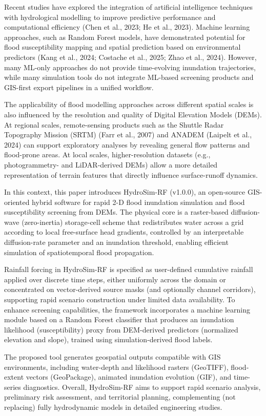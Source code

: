 \documentclass[a4paper,fleqn]{cas-sc}
\begin{document}
Recent studies have explored the integration of artificial intelligence techniques with hydrological modelling to improve predictive performance and computational efficiency (Chen et al., 2023; He et al., 2023). Machine learning approaches, such as Random Forest models, have demonstrated potential for flood susceptibility mapping and spatial prediction based on environmental predictors (Kang et al., 2024; Costache et al., 2025; Zhao et al., 2024). However, many ML-only approaches do not provide time-evolving inundation trajectories, while many simulation tools do not integrate ML-based screening products and GIS-first export pipelines in a unified workflow.

The applicability of flood modelling approaches across different spatial scales is also influenced by the resolution and quality of Digital Elevation Models (DEMs). At regional scales, remote-sensing products such as the Shuttle Radar Topography Mission (SRTM) (Farr et al., 2007) and ANADEM (Laipelt et al., 2024) can support exploratory analyses by revealing general flow patterns and flood-prone areas. At local scales, higher-resolution datasets (e.g., photogrammetry- and LiDAR-derived DEMs) allow a more detailed representation of terrain features that directly influence surface-runoff dynamics.

In this context, this paper introduces HydroSim-RF (v1.0.0), an open-source GIS-oriented hybrid software for rapid 2-D flood inundation simulation and flood susceptibility screening from DEMs. The physical core is a raster-based diffusion-wave (zero-inertia) storage-cell scheme that redistributes water across a grid according to local free-surface head gradients, controlled by an interpretable diffusion-rate parameter and an inundation threshold, enabling efficient simulation of spatiotemporal flood propagation.

Rainfall forcing in HydroSim-RF is specified as user-defined cumulative rainfall applied over discrete time steps, either uniformly across the domain or concentrated on vector-derived source masks (and optionally channel corridors), supporting rapid scenario construction under limited data availability. To enhance screening capabilities, the framework incorporates a machine learning module based on a Random Forest classifier that produces an inundation likelihood (susceptibility) proxy from DEM-derived predictors (normalized elevation and slope), trained using simulation-derived flood labels.

The proposed tool generates geospatial outputs compatible with GIS environments, including water-depth and likelihood rasters (GeoTIFF), flood-extent vectors (GeoPackage), animated inundation evolution (GIF), and time-series diagnostics. Overall, HydroSim-RF aims to support rapid scenario analysis, preliminary risk assessment, and territorial planning, complementing (not replacing) fully hydrodynamic models in detailed engineering studies.
\end{document}
